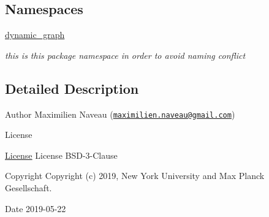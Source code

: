 \subsection*{Namespaces}
\begin{DoxyCompactItemize}
\item 
 \hyperlink{namespacedynamic__graph}{dynamic\+\_\+graph}
\begin{DoxyCompactList}\small\item\em this is this package namespace in order to avoid naming conflict \end{DoxyCompactList}\end{DoxyCompactItemize}


\subsection{Detailed Description}
\begin{DoxyAuthor}{Author}
Maximilien Naveau (\href{mailto:maximilien.naveau@gmail.com}{\tt maximilien.\+naveau@gmail.\+com}) 
\end{DoxyAuthor}
\begin{DoxyRefDesc}{License}
\item[\hyperlink{license__license000014}{License}]License B\+S\+D-\/3-\/\+Clause \end{DoxyRefDesc}
\begin{DoxyCopyright}{Copyright}
Copyright (c) 2019, New York University and Max Planck Gesellschaft. 
\end{DoxyCopyright}
\begin{DoxyDate}{Date}
2019-\/05-\/22 
\end{DoxyDate}
